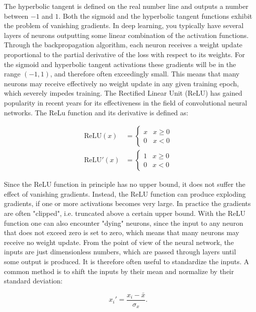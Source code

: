 The hyperbolic tangent is defined on the real number line and outputs
a number between $-1$ and $1$.
Both the sigmoid and the hyperbolic tangent functions exhibit the problem
of vanishing gradients. In deep learning, you typically have several layers
of neurons outputting some linear combination of the activation functions.
Through the backpropagation algorithm, each neuron receives a weight update
proportional to the partial derivative of the loss with respect to
its weights. For the sigmoid and hyperbolic tangent activations these
gradients will be in the range $(-1, 1)$, and therefore often
exceedingly small. This means that many neurons may receive effectively
no weight update in any given training epoch, which severely impedes training.
The Rectified Linear Unit (ReLU) has gained popularity in recent years
for its effectiveness in the field of convolutional neural networks.
The ReLu function and its derivative is defined as:

\begin{equation}
    \begin{split}
        \text{ReLU}(x) &=
    \begin{cases}
        x & x \geq 0 \\
        0 & x < 0
    \end{cases} \\
        \text{ReLU}'(x) &=
    \begin{cases}
        1 & x \geq 0 \\
        0 & x < 0
    \end{cases}
    \end{split}
\end{equation}

Since the ReLU function in principle has no upper bound, it does
not suffer the effect of vanishing gradients. Instead, the ReLU function
can produce exploding gradients, if one or more activations becomes
very large. In practice the gradients are often "clipped", i.e.
truncated above a certain upper bound.
With the ReLU function one can also encounter "dying" neurons,
since the input to any neuron that does not exceed zero
is set to zero, which means that many neurons may receive
no weight update.
From the point of view of the neural network, the inputs are just
dimensionless numbers, which are passed through layers until some output
is produced.
It is therefore often useful to standardize the inputs.
A common method is to shift the inputs by their mean and
normalize by their standard deviation:

\begin{equation}
 x_{i}' = \frac{x_{i} - \bar{x}}{\sigma_x} . 
\end{equation}

